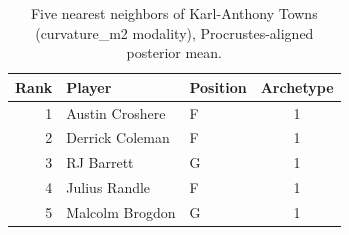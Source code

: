 \begin{table}[htbp]
  \centering\small
  \begin{tabular}{rllc}
    \toprule
    Rank & Player & Position & Archetype \\
    \midrule
    1 & Austin Croshere & F & 1 \\
    2 & Derrick Coleman & F & 1 \\
    3 & RJ Barrett & G & 1 \\
    4 & Julius Randle & F & 1 \\
    5 & Malcolm Brogdon & G & 1 \\
    \bottomrule
  \end{tabular}
  \caption{Five nearest neighbors of Karl-Anthony Towns (curvature_m2 modality), Procrustes-aligned posterior mean.}
  \label{tab:Karl_Anthony_Towns_neighbors_curvature_m2}
\end{table}


